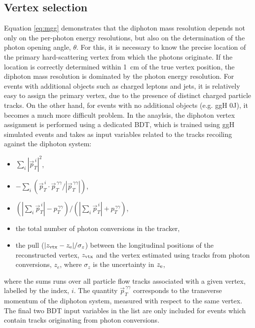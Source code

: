 \subsection{Vertex selection}\label{sec:vertex_selection}
Equation \ref{eq:mgg} demonstrates that the diphoton mass resolution depends not only on the per-photon energy resolutions, but also on the determination of the photon opening angle, $\theta$. For this, it is necessary to know the precise location of the primary hard-scattering vertex from which the photons originate. If the location is correctly determined within 1~cm of the true vertex position, the diphoton mass resolution is dominated by the photon energy resolution. For events with additional objects such as charged leptons and jets, it is relatively easy to assign the primary vertex, due to the presence of distinct charged particle tracks. On the other hand, for \Hgg events with no additional objects (e.g. ggH 0J), it becomes a much more difficult problem. In the \Hgg anaylsis, the diphoton vertex assignment is performed using a dedicated BDT, which is trained using ggH \Hgg simulated events and takes as input variables related to the tracks recoiling against the diphoton system:

\begin{itemize}
    \item $\sum_i |\vec{p}^{\,i}_T|^2$,
    \item $-\sum_i (\vec{p}^{\,i}_T\cdot \vec{p}_T^{\,\gamma\gamma}/|\vec{p}_T^{\,\gamma\gamma}|)$,
    \item $(|\sum_i \vec{p}^{\,i}_T| - p_T^{\,\gamma\gamma})/(|\sum_i \vec{p}^{\,i}_T| + p_T^{\,\gamma\gamma})$,
    \item the total number of photon conversions in the tracker,
    \item the pull ($|z_{\rm{vtx}}-z_{\rm{e}}|/\sigma_z$) between the longitudinal positions of the reconstructed vertex, $z_{\rm{vtx}}$ and the vertex estimated using tracks from photon conversions, $z_e$, where $\sigma_z$ is the uncertainty in $z_{\rm{e}}$,
\end{itemize}

\noindent
where the sums runs over all particle flow tracks associated with a given vertex, labelled by the index, $i$. The quantity $\vec{p}_T^{\,\gamma\gamma}$ corresponds to the transverse momentum of the diphoton system, measured with respect to the same vertex. The final two BDT input variables in the list are only included for events which contain tracks originating from photon conversions. 

